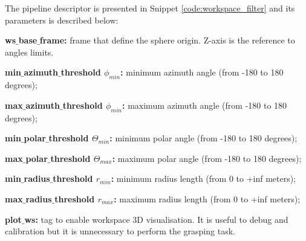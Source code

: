 \begin{figure}[h!] %
\end{figure}

The pipeline descriptor is presented in Snippet \ref{code:workspace_filter} and its parameters is described below:

\begin{itemize_jp}
    \item \textbf{ws$\_$base$\_$frame:} frame that define the sphere origin. Z-axis is the reference to angles limits.
    \item \textbf{min$\_$azimuth$\_$threshold $\phi_{min}$:} minimum azimuth angle (from -180 to 180 degrees);
    \item \textbf{max$\_$azimuth$\_$threshold $\phi_{min}$:} maximum azimuth angle (from -180 to 180 degrees);
    \item \textbf{min$\_$polar$\_$threshold $\Theta_{min}$:} minimum polar angle (from -180 to 180 degrees);
    \item \textbf{max$\_$polar$\_$threshold $\Theta_{max}$:} maximum polar angle (from -180 to 180 degrees);
    \item \textbf{min$\_$radius$\_$threshold $r_{min}$:} minimum radius length (from 0 to +inf meters);
    \item \textbf{max$\_$radius$\_$threshold $r_{max}$:} maximum radius length (from 0 to +inf meters);
    \item \textbf{plot$\_$ws:} tag to enable workspace 3D visualisation. It is useful to debug and calibration but it is unnecessary to perform the grasping task.
\end{itemize_jp}


\begin{snippet}[h!]
\centering
{}
\caption{Workspace filter pipeline descriptor example.}
\label{code:workspace_filter}
\end{snippet}


